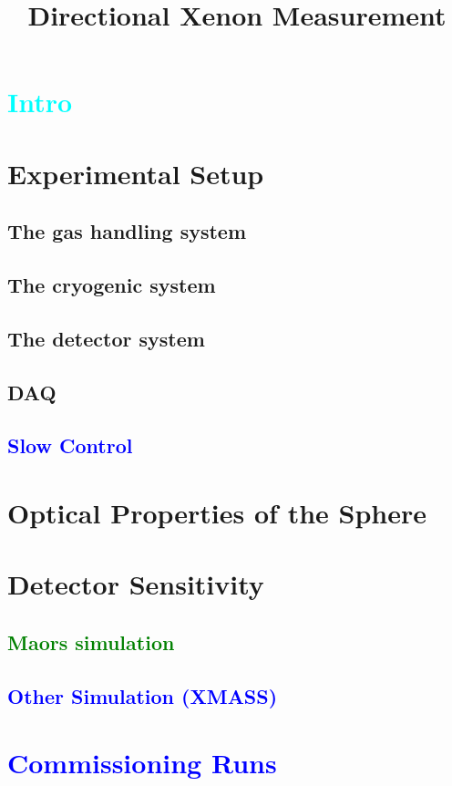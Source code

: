 \documentclass[a4paper,11pt,linenumbers]{article}
\title{Directional Xenon Measurement }
\begin{document}
\maketitle
\flushbottom
\section{\textcolor{cyan}{Intro}}

\section{Experimental Setup}
\subsection{The gas handling system}
\subsection{The cryogenic system}
\subsection{The detector system}
\subsection{DAQ}
\subsection{\textcolor{blue}{Slow Control}}

\section{Optical Properties of the Sphere}
\section{Detector Sensitivity}
\subsection{\textcolor{green}{Maors simulation}}
\subsection{\textcolor{blue}{Other Simulation (XMASS)}}

\section{\textcolor{blue}{Commissioning Runs}}
\end{document}
